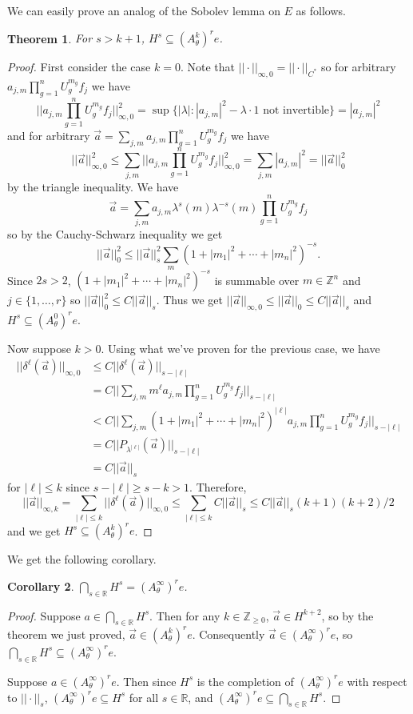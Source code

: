 \documentclass[10pt]{article}
\newtheorem{thm}{Theorem}[section]
\newtheorem{cor}[thm]{Corollary}
\theoremstyle{remark}
\theoremstyle{definition}
\begin{document}
We can easily prove an analog of the Sobolev lemma on $E$ as follows.
\begin{thm}
For $s>k+1$, $H^s\subseteq(A_{\theta}^k)^re$.
\end{thm}
\begin{proof}
First consider the case $k=0$.
Note that $||\cdot||_{\infty,0}=||\cdot||_{C^*}$
so for arbitrary $a_{j,m}\prod_{g=1}^nU_g^{m_g}f_j$ we have
$$||a_{j,m}\prod_{g=1}^nU_g^{m_g}f_j||_{\infty,0}^2=\sup\{|\lambda|:
|a_{j,m}|^2-\lambda\cdot 1\text{ not invertible}\}=|a_{j,m}|^2$$
and for arbitrary $\vec{a}=\sum_{j,m}a_{j,m}\prod_{g=1}^nU_g^{m_g}f_j$ we have
$$||\vec{a}||_{\infty,0}^2
\le\sum_{j,m}||a_{j,m}\prod_{g=1}^nU_g^{m_g}f_j||_{\infty,0}^2
=\sum_{j,m}|a_{j,m}|^2
=||\vec{a}||_0^2$$ by the triangle inequality.
We have
$$\vec{a}
=\sum_{j,m}a_{j,m}\lambda^s(m)\lambda^{-s}(m)\prod_{g=1}^nU_g^{m_g}f_j$$
so by the Cauchy-Schwarz inequality we get
$$||\vec{a}||_0^2\le||\vec{a}||_s^2\sum_m(1+|m_1|^2+\cdots+|m_n|^2)^{-s}.$$
Since $2s>2$, $(1+|m_1|^2+\cdots+|m_n|^2)^{-s}$ is summable over
$m\in\mathbb Z^n$
and $j\in\{1,\ldots,r\}$ so $||\vec{a}||_0^2\le C||\vec{a}||_s$. Thus we get
$||\vec{a}||_{\infty,0}\le||\vec{a}||_0\le C||\vec{a}||_s$ and
$H^s\subseteq(A_{\theta}^0)^re$.

Now suppose $k>0$. Using what we've proven for the previous case, we have
\begin{align*}
||\delta^{\ell}(\vec{a})||_{\infty,0}
&\le C||\delta^{\ell}(\vec{a})||_{s-|\ell|} \\
&= C||\sum_{j,m}m^{\ell}a_{j,m}\prod_{g=1}^nU_g^{m_g}f_j||_{s-|\ell|} \\
&< C||\sum_{j,m}(1+|m_1|^2+\cdots+|m_n|^2)^{|\ell|}
a_{j,m}\prod_{g=1}^nU_g^{m_g}f_j||_{s-|\ell|} \\
&= C||P_{\lambda^{|\ell|}}(\vec{a})||_{s-|\ell|} \\
&= C||\vec{a}||_s
\end{align*}
for $|\ell|\le k$ since $s-|\ell|\ge s-k>1$.
Therefore,
$$||\vec{a}||_{\infty,k}=\sum_{|\ell|\le k}||\delta^{\ell}(\vec{a})||_{\infty,0}
\le\sum_{|\ell|\le k}C||\vec{a}||_s
\le C||\vec{a}||_s(k+1)(k+2)/2$$
and we get $H^s\subseteq(A_{\theta}^k)^re$.
\end{proof}
We get the following corollary.
\begin{cor}
$\displaystyle\bigcap_{s\in\mathbb R}H^s=(A_{\theta}^{\infty})^re$.
\end{cor}
\begin{proof}
Suppose $a\in\bigcap_{s\in\mathbb R}H^s$. Then for any
$k\in\mathbb Z_{\ge 0}$, $\vec{a}\in H^{k+2}$, so by the theorem we just proved,
$\vec{a}\in(A_{\theta}^k)^re$.
Consequently $\vec{a}\in(A_{\theta}^{\infty})^re$, so
$\bigcap_{s\in\mathbb R}H^s\subseteq(A_{\theta}^{\infty})^re$.

Suppose $a\in(A_{\theta}^{\infty})^re$. Then since
$H^s$ is the completion of $(A_{\theta}^{\infty})^re$
with respect to $||\cdot||_s$,
$(A_{\theta}^{\infty})^re\subseteq H^s$ for all $s\in\mathbb R$, and
$(A_{\theta}^{\infty})^re\subseteq\bigcap_{s\in\mathbb R}H^s$.
\end{proof}
\end{document}
